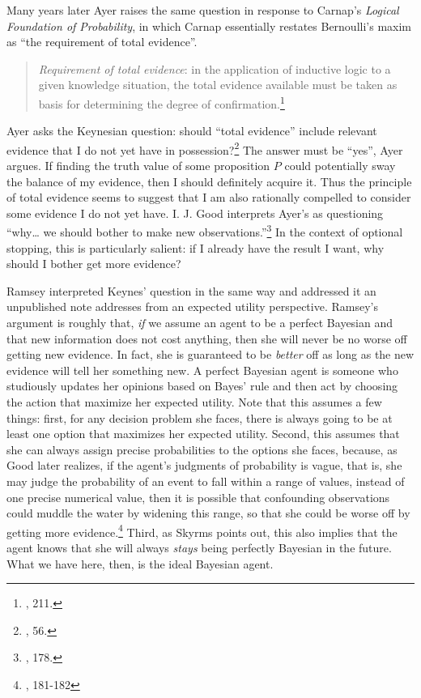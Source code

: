 Many years later Ayer raises the same question in
response to Carnap's \emph{Logical Foundation of Probability}, in which
Carnap essentially restates Bernoulli's maxim as ``the requirement of
total evidence''.

\begin{quote}
\emph{Requirement of total evidence}: in the application of inductive
logic to a given knowledge situation, the total evidence available must
be taken as basis for determining the degree of confirmation.\footnote{\cite{carnapprob}, 211.}
\end{quote}

Ayer asks the Keynesian question: should ``total evidence'' include
relevant evidence that I do not yet have in possession?\footnote{\cite{ayerpae}, 56.} The
answer must be ``yes'', Ayer argues. If finding the truth value of some
proposition \(P\) could potentially sway the balance of my evidence,
then I should definitely acquire it. Thus the principle of total
evidence seems to suggest that I am also rationally compelled to
consider some evidence I do not yet have. I. J. Good interprets Ayer's as questioning ``why\ldots{} we should
bother to make new observations.''\footnote{\cite{goodthinking}, 178.} In the context of optional stopping, this
is particularly salient: if I already have the result I want, why should
I bother get more evidence?

Ramsey interpreted Keynes' question in the same way and addressed it an unpublished note addresses  from an expected utility perspective. Ramsey's argument is roughly that,
\emph{if} we assume an agent to be a perfect Bayesian and that new
information does not cost anything, then she will never be no worse off
getting new evidence. In fact, she is guaranteed to be \emph{better} off
as long as the new evidence will tell her something new. A perfect
Bayesian agent is someone who studiously updates her opinions based on
Bayes' rule and then act by choosing the action that maximize her
expected utility. Note that this assumes a few things: first, for any
decision problem she faces, there is always going to be at least one
option that maximizes her expected utility. Second, this assumes that she can always assign precise probabilities to the options she faces, because, as Good later realizes, if the agent's judgments of probability is vague, that is, she may judge the probability of an event to fall within a range of values, instead of one precise numerical value, then it is possible that confounding observations could muddle the water by widening this range, so that she could be worse off by getting more evidence.\footnote{\cite{goodthinking}, 181-182} Third, as Skyrms points
out, this also implies that the agent knows that she will always
\emph{stays} being perfectly Bayesian in the future. What we have here,
then, is the ideal Bayesian agent.

